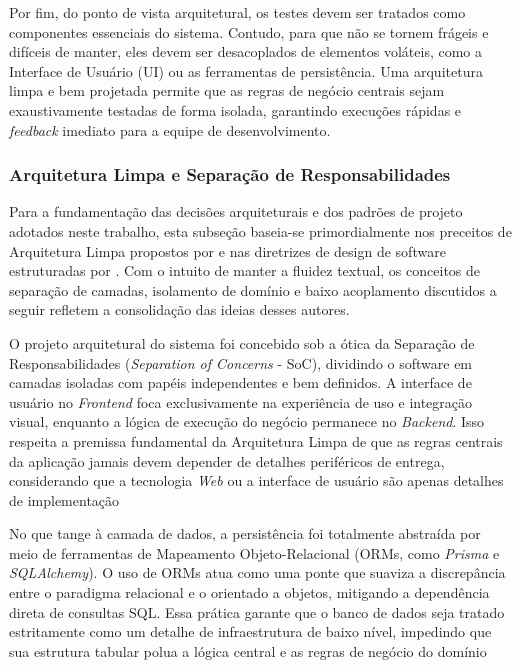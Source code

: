 Por fim, do ponto de vista arquitetural, os testes devem ser tratados como componentes essenciais do sistema. Contudo, para que não se tornem frágeis e difíceis de manter, eles devem ser desacoplados de elementos voláteis, como a Interface de Usuário (UI) ou as ferramentas de persistência. Uma arquitetura limpa e bem projetada permite que as regras de negócio centrais sejam exaustivamente testadas de forma isolada, garantindo execuções rápidas e \textit{feedback} imediato para a equipe de desenvolvimento. %

\subsubsection{Arquitetura Limpa e Separação de Responsabilidades}

Para a fundamentação das decisões arquiteturais e dos padrões de projeto adotados neste trabalho, esta subseção baseia-se primordialmente nos preceitos de Arquitetura Limpa propostos por  e nas diretrizes de design de software estruturadas por . Com o intuito de manter a fluidez textual, os conceitos de separação de camadas, isolamento de domínio e baixo acoplamento discutidos a seguir refletem a consolidação das ideias desses autores. %

O projeto arquitetural do sistema foi concebido sob a ótica da Separação de Responsabilidades (\textit{Separation of Concerns} - SoC), dividindo o software em camadas isoladas com papéis independentes e bem definidos. A interface de usuário no \textit{Frontend} foca exclusivamente na experiência de uso e integração visual, enquanto a lógica de execução do negócio permanece no \textit{Backend}. Isso respeita a premissa fundamental da Arquitetura Limpa de que as regras centrais da aplicação jamais devem depender de detalhes periféricos de entrega, considerando que a tecnologia \textit{Web} ou a interface de usuário são apenas detalhes de implementação %

No que tange à camada de dados, a persistência foi totalmente abstraída por meio de ferramentas de Mapeamento Objeto-Relacional (ORMs, como \textit{Prisma} e \textit{SQLAlchemy}). O uso de ORMs atua como uma ponte que suaviza a discrepância entre o paradigma relacional e o orientado a objetos, mitigando a dependência direta de consultas SQL. Essa prática garante que o banco de dados seja tratado estritamente como um detalhe de infraestrutura de baixo nível, impedindo que sua estrutura tabular polua a lógica central e as regras de negócio do domínio %

